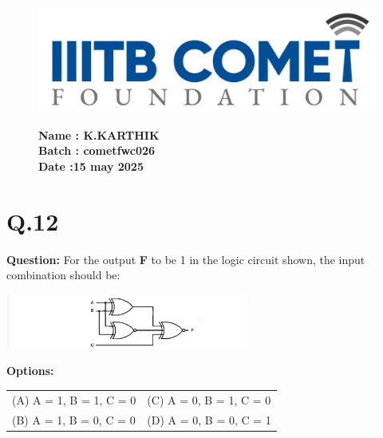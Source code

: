 \documentclass[12pt]{article}
\begin{document}
\begin{figure}[h!]                                        \begin{minipage}{0.45\textwidth}  %
        \includegraphics[width=\textwidth]{sun.png}  %
    \end{minipage} \hfill
    \begin{minipage}{0.45\textwidth}  %
        \textbf{Name : K.KARTHIK} \\
    \textbf{Batch : cometfwc026} \\
  \textbf{Date :15 may 2025}                              \end{minipage}
\end{figure}
\section*{Q.12}

\noindent
\textbf{Question:} For the output \textbf{F} to be 1 in the logic circuit shown, the input combination should be:

\vspace{1em}

\begin{center}
\includegraphics[width=0.6\textwidth]{can.png}
\end{center}

\vspace{1em}

\noindent
\textbf{Options:}

\vspace{0.5em}

\begin{tabular}{ll}
(A) A = 1, B = 1, C = 0 & (C) A = 0, B = 1, C = 0 \\
(B) A = 1, B = 0, C = 0 & (D) A = 0, B = 0, C = 1 \\
\end{tabular}
\end{document}
